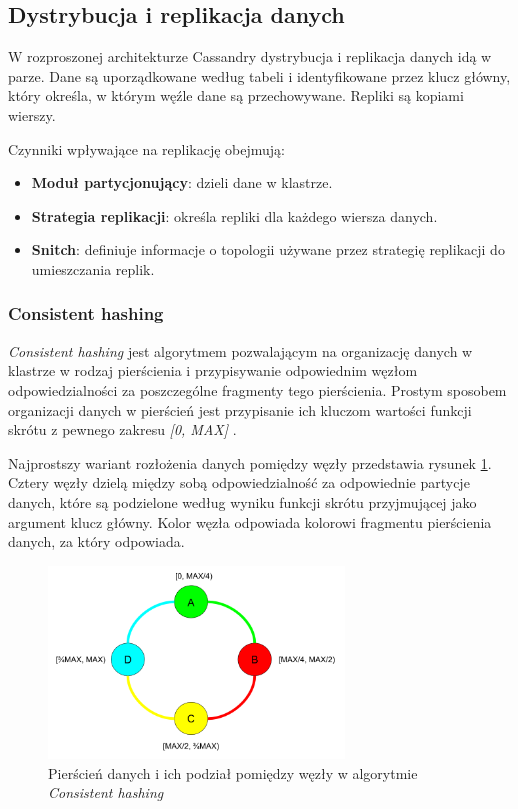 \subsection{Dystrybucja i replikacja danych}

W rozproszonej architekturze Cassandry dystrybucja i replikacja danych idą w parze.
Dane są uporządkowane według tabeli i identyfikowane przez klucz główny, który określa, w którym węźle dane są przechowywane.
Repliki są kopiami wierszy.

Czynniki wpływające na replikację obejmują: 
\begin{itemize}
    \item \textbf{Moduł partycjonujący}: dzieli dane w klastrze.
    \item \textbf{Strategia replikacji}: określa repliki dla każdego wiersza danych.
    \item \textbf{Snitch}: definiuje informacje o topologii używane przez strategię replikacji do umieszczania replik.
\end{itemize}

\subsubsection{Consistent hashing}

\textit{Consistent hashing} jest algorytmem pozwalającym na organizację danych w klastrze w rodzaj pierścienia i przypisywanie odpowiednim węzłom odpowiedzialności za poszczególne fragmenty tego pierścienia. 
Prostym sposobem organizacji danych w pierścień jest przypisanie ich kluczom wartości funkcji skrótu z pewnego zakresu \textit{[0, MAX]} \cite{consistentHashing}.

Najprostszy wariant rozłożenia danych pomiędzy węzły przedstawia rysunek \ref{fig:cassandraConsistenHashing}.
Cztery węzły dzielą między sobą odpowiedzialność za odpowiednie partycje danych, które są podzielone według wyniku funkcji skrótu przyjmującej jako argument klucz główny.
Kolor węzła odpowiada kolorowi fragmentu pierścienia danych, za który odpowiada.

\begin{figure}[!ht]
\centering
\includegraphics[width=0.7\textwidth]{figures/consisten_hashing.png}
\caption{Pierścień danych i ich podział pomiędzy węzły w algorytmie \textit{Consistent hashing}}
\label{fig:cassandraConsistenHashing}
\end{figure}

